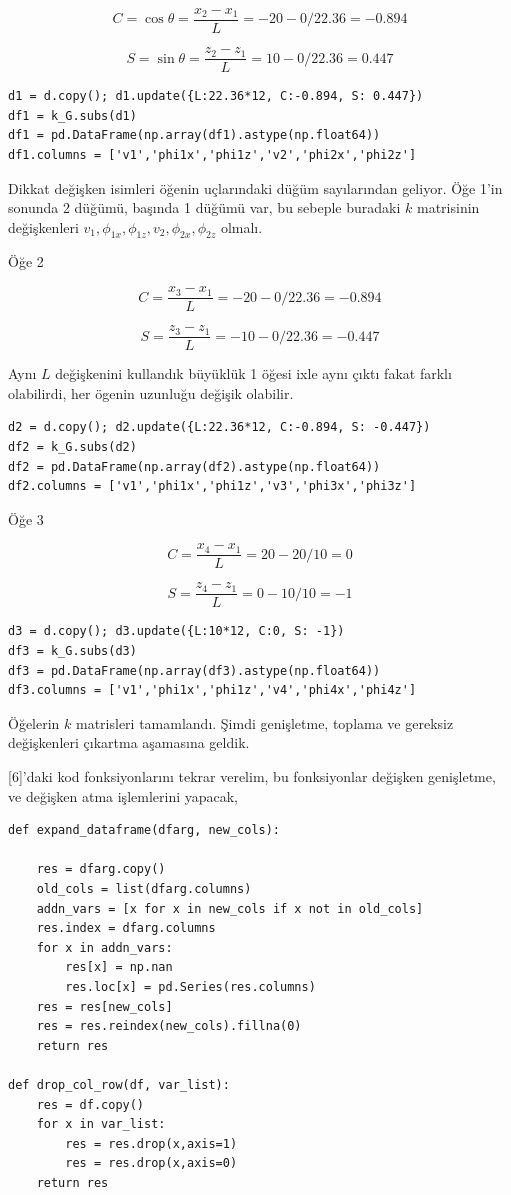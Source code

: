 \documentclass[12pt,fleqn]{article}\usepackage{../../common}
\begin{document}
$$
C = \cos\theta = \frac{x_2-x_1}{L} = -20-0 / 22.36 = -0.894
$$

$$
S = \sin\theta = \frac{z_2-z_1}{L} = 10-0 / 22.36 = 0.447
$$

\begin{verbatim}
d1 = d.copy(); d1.update({L:22.36*12, C:-0.894, S: 0.447})
df1 = k_G.subs(d1)
df1 = pd.DataFrame(np.array(df1).astype(np.float64))
df1.columns = ['v1','phi1x','phi1z','v2','phi2x','phi2z']
\end{verbatim}

Dikkat değişken isimleri öğenin uçlarındaki düğüm sayılarından geliyor. Öğe 1'in
sonunda 2 düğümü, başında 1 düğümü var, bu sebeple buradaki $k$ matrisinin
değişkenleri $v_1,\phi_{1x},\phi_{1z},v_2,\phi_{2x},\phi_{2z}$ olmalı.

Öğe 2

$$
C = \frac{x_3-x_1}{L} = -20-0 / 22.36 = -0.894
$$

$$
S = \frac{z_3-z_1}{L} = -10-0 / 22.36 = -0.447
$$

Aynı $L$ değişkenini kullandık büyüklük 1 öğesi ixle aynı çıktı fakat farklı
olabilirdi, her ögenin uzunluğu değişik olabilir.

\begin{verbatim}
d2 = d.copy(); d2.update({L:22.36*12, C:-0.894, S: -0.447})
df2 = k_G.subs(d2)
df2 = pd.DataFrame(np.array(df2).astype(np.float64))
df2.columns = ['v1','phi1x','phi1z','v3','phi3x','phi3z']
\end{verbatim}

Öğe 3

$$
C = \frac{x_4-x_1}{L} = 20-20 / 10 = 0
$$

$$
S = \frac{z_4-z_1}{L} = 0-10 / 10 = -1
$$

\begin{verbatim}
d3 = d.copy(); d3.update({L:10*12, C:0, S: -1})
df3 = k_G.subs(d3)
df3 = pd.DataFrame(np.array(df3).astype(np.float64))
df3.columns = ['v1','phi1x','phi1z','v4','phi4x','phi4z']
\end{verbatim}

Öğelerin $k$ matrisleri tamamlandı. Şimdi genişletme, toplama ve gereksiz
değişkenleri çıkartma aşamasına geldik.

[6]'daki kod fonksiyonlarını tekrar verelim, bu fonksiyonlar değişken
genişletme, ve değişken atma işlemlerini yapacak,

\begin{verbatim}
def expand_dataframe(dfarg, new_cols):

    res = dfarg.copy()
    old_cols = list(dfarg.columns)
    addn_vars = [x for x in new_cols if x not in old_cols]
    res.index = dfarg.columns
    for x in addn_vars:
        res[x] = np.nan
        res.loc[x] = pd.Series(res.columns)
    res = res[new_cols]
    res = res.reindex(new_cols).fillna(0)
    return res

def drop_col_row(df, var_list):
    res = df.copy()
    for x in var_list:
        res = res.drop(x,axis=1)
        res = res.drop(x,axis=0)
    return res    

\end{verbatim}
\end{document}
